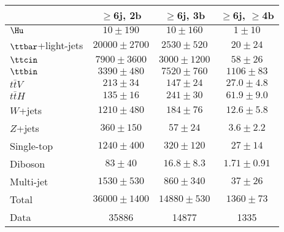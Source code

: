 \begin{table}[htbp]
\begin{center}
\begin{tabular}{l*{3}{c}}
\hline\hline
 & $\geq$6j, 2b & $\geq$6j, 3b & $\geq$6j, $\geq$4b \\
\hline
$\Hu$ &   $ 10 \pm 190 $ &   $ 10 \pm 160 $ &   $ 1 \pm 10 $ \\ 
\hline
$\ttbar$+light-jets  &   $ 20000 \pm 2700 $ &   $ 2530 \pm 520 $ &   $ 20 \pm 24 $ \\ 
$\ttcin$  &   $ 7900 \pm 3600 $ &   $ 3000 \pm 1200 $ &   $ 58 \pm 26 $ \\ 
$\ttbin$  &   $ 3390 \pm 480 $ &   $ 7520 \pm 760 $ &   $ 1106 \pm 83 $ \\ 
$t\bar{t}V$  &   $ 213 \pm 34 $ &   $ 147 \pm 24 $ &   $ 27.0 \pm 4.8 $ \\ 
$t\bar{t}H$  &   $ 135 \pm 16 $ &   $ 241 \pm 30 $ &   $ 61.9 \pm 9.0 $ \\ 
$W$+jets  &   $ 1210 \pm 480 $ &   $ 184 \pm 76 $ &   $ 12.6 \pm 5.8 $ \\ 
$Z$+jets  &   $ 360 \pm 150 $ &   $ 57 \pm 24 $ &   $ 3.6 \pm 2.2 $ \\ 
Single-top  &   $ 1240 \pm 400 $ &   $ 320 \pm 120 $ &   $ 27 \pm 14 $ \\ 
Diboson  &   $ 83 \pm 40 $ &   $ 16.8 \pm 8.3 $ &   $ 1.71 \pm 0.91 $ \\ 
Multi-jet  &   $ 1530 \pm 530 $ &   $ 860 \pm 340 $ &   $ 37 \pm 26 $ \\ 
\hline
Total &   $ 36000 \pm 1400 $ &   $ 14880 \pm 530 $ &   $ 1360 \pm 73 $ \\ 
\hline
Data & 35886  & 14877  & 1335  \\
\hline\hline      
\end{tabular}
%
\end{center}
\label{tab:Hbb_Postfit_Yields_Unblind_Hu}
\end{table}
